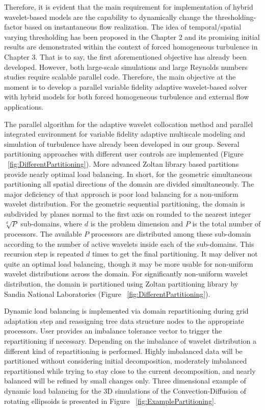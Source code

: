 \begin{itemize}
{Therefore, it is evident that the main requirement for implementation of hybrid wavelet-based models
are the capability to dynamically change the thresholding-factor based on instantaneous flow realization. 
The idea of temporal/spatial varying thresholding has been proposed in the Chapter 2
and its promising initial results are demonstrated within the context of forced homogeneous turbulence in Chapter 3.
%
That is to say, the first aforementioned objective has already been developed. However, both large-scale simulations and large Reynolds numbers studies require scalable parallel code. Therefore, the main objective at the moment is to develop a parallel variable fidelity adaptive wavelet-based solver with hybrid models for both forced homogeneous turbulence and external flow applications.

The parallel algorithm for the adaptive wavelet collocation method and 
parallel integrated environment for variable fidelity adaptive multiscale modeling and simulation of turbulence
have already been developed in our group. 
%
Several partitioning approaches with different user controls are implemented (Figure ~\ref{fig:DifferentPartitioning}). More
advanced Zoltan\cite{ZoltanOverviewArticle,ZoltanHomePage,ZoltanUsersGuideV3,ZoltanDevelopersGuideV3,ZoltanHypergraphIPDPS06,ZoltanParHypRepart07}
library based partitions provide nearly optimal load balancing. In short, for
the geometric simultaneous partitioning all spatial directions of the domain are divided simultaneously.
The major deficiency of that approach is poor load balancing for a non-uniform
wavelet distribution. For the geometric sequential partitioning, the domain is subdivided by
planes normal to the first axis on rounded to the nearest integer $\sqrt[d]{P}$ sub-domains, where $d$ is
the problem dimension and $P$ is the total number of processors. The available $P$ processors
are distributed among these sub-domain according to the number of active wavelets inside
each of the sub-domains. This recursion step is repeated $d$ times to get the final partitioning.
It may deliver not quite an optimal load balancing, though it may be more usable for
non-uniform wavelet distributions across the domain. For significantly non-uniform wavelet
distribution, the domain is partitioned using Zoltan partitioning library by Sandia National
Laboratories (Figure ~\ref{fig:DifferentPartitioning}).



Dynamic load balancing is implemented via domain repartitioning during grid adaptation
step and reassigning tree data structure nodes to the appropriate processors. User provides
an imbalance tolerance vector to trigger the repartitioning if necessary. Depending on the
imbalance of wavelet distribution a different kind of repartitioning is performed. Highly
imbalanced data will be partitioned without considering initial decomposition, moderately
imbalanced repartitioned while trying to stay close to the current decomposition, and nearly
balanced will be refined by small changes only.
%
Three dimensional example of dynamic load balancing
for the 3D simulations of the Convection-Diffusion of rotating ellipsoids
is presented in Figure ~\ref{fig:ExamplePartitioning}.

}
\end{itemize}
